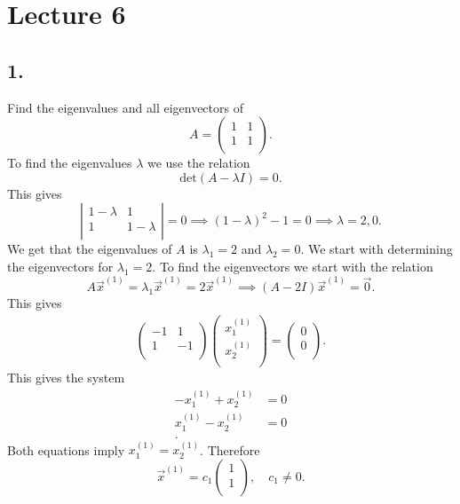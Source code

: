 \section*{Lecture 6}

\subsection*{1.} Find the eigenvalues and all eigenvectors of
\[ 
A = \begin{pmatrix}
1 & 1\\
1 & 1\\
\end{pmatrix}
.\]
\bigbreak
To find the eigenvalues $\lambda$ we use the relation
\[ 
\mathrm{det}(A-\lambda I) = 0
.\]
This gives
\[ 
\left| \begin{array}{cc}
1 - \lambda & 1\\
1 & 1 -\lambda\\
\end{array} \right| = 0 \implies (1-\lambda)^2 - 1 = 0 \implies \lambda = {2,0}
.\]
We get that the eigenvalues of $A$ is $\lambda_1 = 2$ and $\lambda_2 = 0$. We start with determining the eigenvectors for $\lambda_1 =2$. To find the eigenvectors we start with the relation
\[ 
  A \Vec{x}^{(1)} = \lambda_1 \Vec{x}^{(1)} = 2 \Vec{x}^{(1)} \implies (A - 2I) \Vec{x}^{(1)} = \Vec{0}
.\]
This gives
\begin{align*}
  \begin{pmatrix}
  -1 & 1\\
  1 & -1\\
  \end{pmatrix} \begin{pmatrix}
  x_1^{(1)}\\
  x_2^{(1)}\\
  \end{pmatrix} = \begin{pmatrix}
  0\\
  0\\
  \end{pmatrix}
.\end{align*}
This gives the system
\begin{align*}
  -x_1^{(1)} + x_2^{(1)} &= 0 \\
  x_1^{(1)} - x_2^{(1)} &= 0 \\
.\end{align*}
Both equations imply $x_1^{(1)} = x_2^{(1)}$. Therefore
\[ 
\Vec{x}^{(1)} = c_1 \begin{pmatrix}
1\\
1\\
\end{pmatrix}, \quad c_1 \neq 0
.\]
